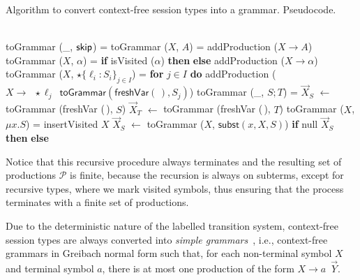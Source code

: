 \begin{algorithm}
\caption{Algorithm to convert context-free session types into a grammar. Pseudocode.}
\label{alg:toGrammar}
\begin{algorithmic}
\\
\State \textsf{toGrammar} (\_, $\mathsf{skip}$) = 
\State \qquad \Return{$\varepsilon$}\smallskip
\State \textsf{toGrammar} ($X$, $A$) = 
\State \qquad \textsf{addProduction} ($X \rightarrow A$)
\State \qquad {}\smallskip
\State \textsf{toGrammar} ($X$, $\alpha$) = 
\State \qquad\textbf{if} \textsf{isVisited} ($\alpha$) \textbf {then}
\State \qquad\qquad \Return{$\alpha$}
\State \qquad\textbf{else}
\State \qquad\qquad \textsf{addProduction} ($X \rightarrow \alpha$)
\State \qquad\qquad {}\smallskip
\State \textsf{toGrammar} ($X$, $\star \{\ell_i : S_i \}_{j\in I}$) =  
\State \qquad \textbf{for} {$j\in I$} \textbf{do} 
\State \qquad \qquad \textsf{addProduction} ($X \rightarrow \enspace \star \ell_j \enspace \mathsf{toGrammar}(\mathsf{freshVar}(\,), S_j)$)
\State \qquad \qquad {}\smallskip
\State \textsf{toGrammar} (\_, $S;T$) =
\State \qquad $\vec X_S$ $\gets$ \textsf{toGrammar} (\textsf{freshVar} (\,), $S$)
\State \qquad $\vec X_T$ $\gets$ \textsf{toGrammar} (\textsf{freshVar} (\,), $T$)
\State \qquad {}\smallskip
\State \textsf{toGrammar} ($X$, $\mu x.S$) =
\State \qquad \textsf{insertVisited} $X$\smallskip
\State \qquad $\vec X_S$ $\gets$ \textsf{toGrammar} ($X$, $\mathsf{subst}(x,X,S)$)
\State \qquad \textbf{if} \textsf{null} $\vec X_S$ \textbf{then} 
\State \qquad \qquad \Return{$\varepsilon$}
\State \qquad \textbf{else} 
\State \qquad \qquad {}\smallskip
\end{algorithmic}
\end{algorithm}



Notice that this recursive procedure always terminates and the resulting 
set of productions $\mathcal{P}$ is finite, because the recursion is always 
on subterms, except for recursive types, where we mark visited symbols, thus 
ensuring that the process terminates with a finite set of productions.

Due to the deterministic nature of the labelled transition system, context-free 
session types are always converted into \emph{simple grammars}~\cite{baeten1993decidability}, i.e., 
context-free grammars in Greibach normal form such that, for each non-terminal 
symbol $X$ and terminal symbol $a$, there is at most one production of the form 
$X\rightarrow a \enspace \vec Y$.

